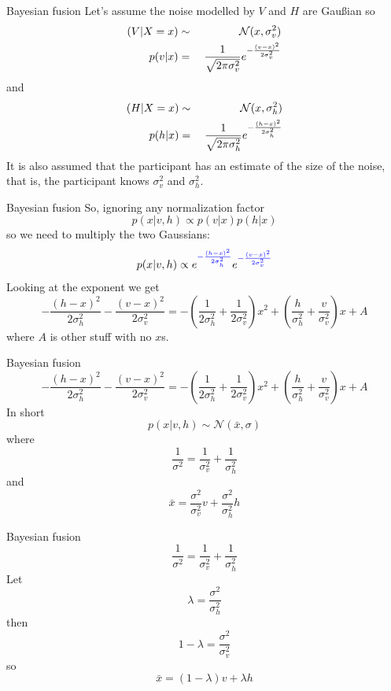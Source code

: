 \documentclass{beamer}
\newcommand{\crish}{\color{reddish}}
\newcommand{\cbla}{\color{black}}
\newcommand{\cred}{\color{red}}
\newcommand{\cblu}{\color{blue}}
\begin{document}
\begin{frame}{Bayesian fusion}
  Let's assume the noise modelled by \cblu$V$\cbla{} and \cred$H$\cbla{} are Gau\ss{}ian so
\cblu
  \begin{eqnarray*}
    (V|X=x)&\sim{}&\mathcal{N}(x,\sigma_v^2)\cr
    p(v|x)&=&\frac{1}{\sqrt{2\pi\sigma_v^2}}e^{-\frac{(v-x)^2}{2\sigma_v^2}}
  \end{eqnarray*}
  \cbla{}
  and
    \cred
  \begin{eqnarray*}
    (H|X=x)&\sim{}&\mathcal{N}(x,\sigma_h^2)\cr
    p(h|x)&=&\frac{1}{\sqrt{2\pi\sigma_h^2}}e^{-\frac{(h-x)^2}{2\sigma_h^2}}
  \end{eqnarray*}
  \cbla{}
  It is also assumed that the participant has an estimate of the size of the noise, that is, the participant knows \cblu$\sigma_v^2$\cbla{} and \cred$\sigma_h^2$\cbla{}.
\end{frame}
  

\begin{frame}{Bayesian fusion}
So, ignoring any normalization factor
  \crish$$
  p(x|v,h)\propto p(v|x)p(h|x)
  $$\cbla{}
  so we need to multiply the two Gaussians:
  \crish$$
  p(x|v,h)\propto e^{\cblu-\frac{(h-x)^2}{2\sigma_h^2}\cbla}e^{\cblu-\frac{(v-x)^2}{2\sigma_v^2}\cbla}
  $$\cbla{}
  Looking at the exponent we get
\cblu$$
-\frac{(h-x)^2}{2\sigma_h^2}-\frac{(v-x)^2}{2\sigma_v^2}=-\left(\frac{1}{2\sigma_h^2}+\frac{1}{2\sigma_v^2}\right)x^2+\left(\frac{h}{\sigma_h^2}+\frac{v}{\sigma_v^2}\right)x+A
    $$\cbla{}
  where \cblu$A$\cbla{} is other stuff with no \cblu$x$\cbla{}s.
  \end{frame}


\begin{frame}{Bayesian fusion}
\crish$$
-\frac{(h-x)^2}{2\sigma_h^2}-\frac{(v-x)^2}{2\sigma_v^2}=-\left(\frac{1}{2\sigma_h^2}+\frac{1}{2\sigma_v^2}\right)x^2+\left(\frac{h}{\sigma_h^2}+\frac{v}{\sigma_v^2}\right)x+A
    $$\cbla{}
In short
\crish$$
p(x|v,h)\sim \mathcal{N}(\bar{x},\sigma)
$$\cbla{}
where
\crish$$
\frac{1}{\sigma^2}=\frac{1}{\sigma_v^2}+\frac{1}{\sigma_h^2}
$$\cbla{}
and
\crish$$
\bar{x}=\frac{\sigma^2}{\sigma_v^2}v+\frac{\sigma^2}{\sigma_h^2}h
$$\cbla{}
\end{frame}



\begin{frame}{Bayesian fusion}
\crish$$
\frac{1}{\sigma^2}=\frac{1}{\sigma_v^2}+\frac{1}{\sigma_h^2}
$$\cbla{}
Let
\crish$$
\lambda=\frac{\sigma^2}{\sigma_h^2}
$$\cbla{}
then
\crish$$
1-\lambda=\frac{\sigma^2}{\sigma_v^2}
$$\cbla{}
so
\crish$$
\bar{x}=(1-\lambda)v+\lambda h
$$\cbla{}
\end{frame}
\end{document}
